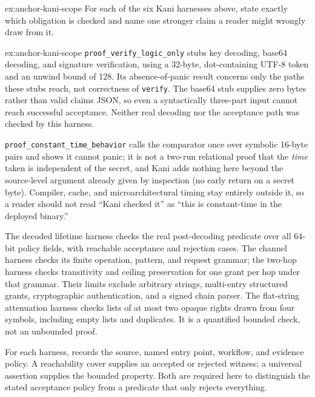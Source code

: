 \documentclass[11pt,a4paper]{article}
\theoremstyle{definition}
\begin{document}

\begin{pdexercise}[kind=Check,rating=2]{ex:anchor-kani-scope}
For each of the six Kani harnesses above, state exactly which obligation is checked and name one stronger claim a reader might wrongly draw from it.
\end{pdexercise}
\begin{pdsolution}{ex:anchor-kani-scope}
\texttt{proof\_verify\_logic\_only} stubs key decoding, base64 decoding, and signature verification, using a 32-byte, dot-containing UTF-8 token and an unwind bound of 128. Its absence-of-panic result concerns only the paths these stubs reach, not correctness of \texttt{verify}. The base64 stub supplies zero bytes rather than valid claims JSON, so even a syntactically three-part input cannot reach successful acceptance. Neither real decoding nor the acceptance path was checked by this harness.

\texttt{proof\_constant\_time\_behavior} calls the comparator once over symbolic 16-byte pairs and shows it cannot panic; it is not a two-run relational proof that the \emph{time} taken is independent of the secret, and Kani adds nothing here beyond the source-level argument already given by inspection (no early return on a secret byte). Compiler, cache, and microarchitectural timing stay entirely outside it, so a reader should not read ``Kani checked it'' as ``this is constant-time in the deployed binary.''

The decoded lifetime harness checks the real post-decoding predicate over all
64-bit policy fields, with reachable acceptance and rejection cases. The
channel harness checks its finite operation, pattern, and request grammar;
the two-hop harness checks transitivity and ceiling preservation for one
grant per hop under that grammar. Their limits exclude arbitrary strings,
multi-entry structured grants, cryptographic authentication, and a signed
chain parser. The flat-string attenuation harness checks lists of at most
two opaque rights drawn from four symbols, including empty lists and
duplicates. It is a quantified bounded check, not an unbounded proof.

For each harness,  records the source, named entry
point, workflow, and evidence policy. A reachability cover supplies an
accepted or rejected witness; a universal assertion supplies the bounded
property. Both are required here to distinguish the stated acceptance policy from a
predicate that only rejects everything.
\end{pdsolution}
\end{document}
